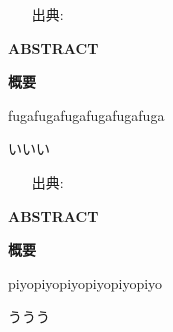 
\begin{itemize}
\item[出典:] 
\end{itemize}

\hrulefill

\begin{multicolpar}{2}
\bf{ABSTRACT}

\bf{概要}

fugafugafugafugafugafuga

いいい

\end{multicolpar}



\begin{itemize}
\item[出典:] 
\end{itemize}

\hrulefill

\begin{multicolpar}{2}
\bf{ABSTRACT}

\bf{概要}

piyopiyopiyopiyopiyopiyo

ううう

\end{multicolpar}



